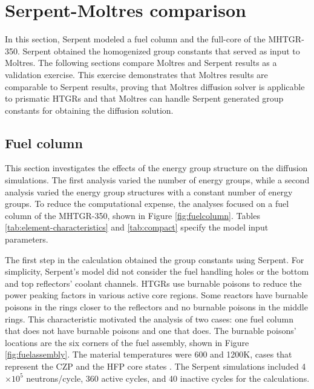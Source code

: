 \section{Serpent-Moltres comparison}
\label{sec:neut-serpent}

In this section, Serpent modeled a fuel column and the full-core of the MHTGR-350.
Serpent obtained the homogenized group constants that served as input to Moltres.
The following sections compare Moltres and Serpent results as a validation exercise.
This exercise demonstrates that Moltres results are comparable to Serpent results, proving that Moltres diffusion solver is applicable to prismatic HTGRs and that Moltres can handle Serpent generated group constants for obtaining the diffusion solution.

\subsection{Fuel column}
\label{sec:neut-fuelcol}

This section investigates the effects of the energy group structure on the diffusion simulations.
The first analysis varied the number of energy groups, while a second analysis varied the energy group structures with a constant number of energy groups.
To reduce the computational expense, the analyses focused on a fuel column of the MHTGR-350, shown in Figure \ref{fig:fuelcolumn}.
Tables \ref{tab:element-characteristics} and \ref{tab:compact} specify the model input parameters.

The first step in the calculation obtained the group constants using Serpent.
For simplicity, Serpent's model did not consider the fuel handling holes or the bottom and top reflectors' coolant channels.
HTGRs use burnable poisons to reduce the power peaking factors in various active core regions.
Some reactors have burnable poisons in the rings closer to the reflectors and no burnable poisons in the middle rings.
This characteristic motivated the analysis of two cases: one fuel column that does not have burnable poisons and one that does.
The burnable poisons' locations are the six corners of the fuel assembly, shown in Figure \ref{fig:fuelassembly}.
The material temperatures were 600 and 1200K, cases that represent the \gls{CZP} and the \gls{HFP} core states \cite{strydom_results_2015}.
The Serpent simulations included 4$\times 10^5$ neutrons/cycle, 360 active cycles, and 40 inactive cycles for the calculations.

